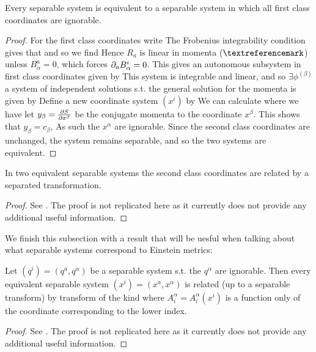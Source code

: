 \documentclass{article}
\begin{document}
\begin{prop}
Every separable system is equivalent to a separable system in which all first class coordinates are ignorable. 
\end{prop}
\begin{proof}
For the first class coordinates write
The Frobenius integrability condition gives that 
and so we find 
Hence $R_a$ is linear in momenta ($\contradiction$) unless $B_\alpha^a=0$, which forces $\del_a B_\alpha^i = 0$. This gives an autonomous subsystem in first class coordinates given by 
This system is integrable and linear, and so $\exists \phi^{(\beta)}$ a system of independent solutions s.t. the general solution for the momenta is given by 
Define a new coordinate system $(x^i)$ by 
We can calculate 
where we have let $y_\beta = \pd[S]{x^\beta}$ be the conjugate momenta to the coordinate $x^\beta$. This shows that $y_\beta = c_\beta$, As such the $x^\alpha$ are ignorable. Since the second class coordinates are unchanged, the system remains separable, and so the two systems are equivalent.  
\end{proof}


\begin{prop}
In two equivalent separable systems the second class coordinates are related by a separated transformation.  
\end{prop}
\begin{proof}
See \cite{Benenti1991}. The proof is not replicated here as it currently does not provide any additional useful information.
\end{proof}

We finish this subsection with a result that will be uesful when talking about what separable systems correspond to Einstein metrics:

\begin{prop}
Let $(q^i)=(q^a, q^\alpha)$ be a separable system s.t. the $q^\alpha$ are ignorable. Then every equivalent separable system $(x^i) = (x^a, x^\alpha)$ is related (up to a separable transform) by transform of the kind 
where $A^\alpha_i = A^\alpha_i(x^i)$ is a function only of the coordinate corresponding to the lower index. 
\end{prop}
\begin{proof}
See \cite{Benenti1991}. The proof is not replicated here as it currently does not provide any additional useful information.
\end{proof}
\end{document}
